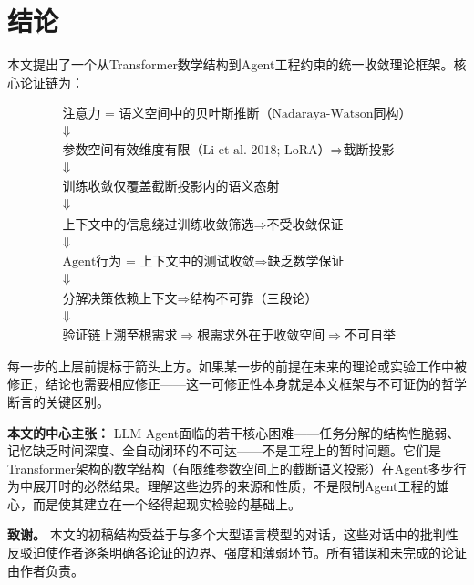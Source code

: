 \documentclass[11pt,a4paper]{ctexart}
\begin{document}
\section{结论}

本文提出了一个从Transformer数学结构到Agent工程约束的统一收敛理论框架。核心论证链为：

\[
\boxed{
\begin{array}{c}
\text{注意力 = 语义空间中的贝叶斯推断（Nadaraya-Watson同构）} \\
\Downarrow \\
\text{参数空间有效维度有限（Li et al. 2018; LoRA）} \Longrightarrow \text{截断投影} \\
\Downarrow \\
\text{训练收敛仅覆盖截断投影内的语义态射} \\
\Downarrow \\
\text{上下文中的信息绕过训练收敛筛选} \Longrightarrow \text{不受收敛保证} \\
\Downarrow \\
\text{Agent行为 = 上下文中的测试收敛} \Longrightarrow \text{缺乏数学保证} \\
\Downarrow \\
\text{分解决策依赖上下文} \Longrightarrow \text{结构不可靠（三段论）} \\
\Downarrow \\
\text{验证链上溯至根需求} \Longrightarrow \text{根需求外在于收敛空间} \Longrightarrow \text{不可自举}
\end{array}
}
\]

每一步的上层前提标于箭头上方。如果某一步的前提在未来的理论或实验工作中被修正，结论也需要相应修正——这一可修正性本身就是本文框架与不可证伪的哲学断言的关键区别。

\textbf{本文的中心主张：} LLM Agent面临的若干核心困难——任务分解的结构性脆弱、记忆缺乏时间深度、全自动闭环的不可达——不是工程上的暂时问题。它们是Transformer架构的数学结构（有限维参数空间上的截断语义投影）在Agent多步行为中展开时的必然结果。理解这些边界的来源和性质，不是限制Agent工程的雄心，而是使其建立在一个经得起现实检验的基础上。

\vspace{12pt}

\noindent\textbf{致谢。} 本文的初稿结构受益于与多个大型语言模型的对话，这些对话中的批判性反驳迫使作者逐条明确各论证的边界、强度和薄弱环节。所有错误和未完成的论证由作者负责。

\end{document}
